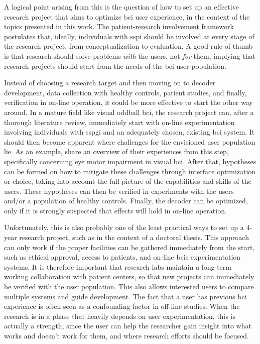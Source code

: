 A logical point arising from this is the question of how to set up an
effective research project that aims to optimize \ac{bci} user experience, in
the context of the topics presented in this work.
The patient-research involvement framework postulates that, ideally, individuals with
\ac{sspi} should be involved at every stage of the research project, from conceptualization
to evaluation.
A good rule of thumb is that research should solve problems \emph{with} the
users, not \emph{for} them, implying that research projects should start from
the needs of the \ac{bci} user population.

Instead of choosing a research target and then moving on to decoder
development, data collection with healthy controls, patient studies, and
finally, verification in on-line operation, it could be more effective to start
the other way around.
In a mature field like visual oddball \ac{bci}, the research project can, after
a thorough literature review, immediately start with on-line experimentation
involving individuals with \ac{sspgi} and an adequately chosen, existing \ac{bci} system.
It should then become apparent where challenges for the envisioned user
population lie.
As an example, \textcite{FriedOken2020} share an overview of their experiences from this step,
specifically concerning eye motor impairment in visual \ac{bci}.
After that, hypotheses can be formed on how to mitigate these challenges
through interface optimization or choice, taking into account the full picture
of the capabilities and skills of the users.
These hypotheses can then be verified in experiments
with the users and/or a population of healthy controls.
Finally, the decoder can be optimized, only if it is strongly suspected that
effects will hold in on-line operation.

Unfortunately, this is also probably one of the least practical ways to set up
a 4-year research project, such as in the context of a doctoral thesis.
This approach can only work if the proper facilities can be gathered immediately
from the start, such as ethical approval, access to patients, and on-line \acp{bci}
experimentation systems.
It is therefore important that research labs maintain a long-term working
collaboration with patient centers, so that new projects can immediately be
verified with the user population. This also allows interested users to compare
multiple systems and guide development.
The fact that a user has previous \ac{bci} experience is often seen as a confounding
factor in off-line studies.
When the research is in a phase that heavily depends on user
experimentation, this is actually a strength, since the user can help the researcher gain
insight into what works and doesn’t work for them, and where research efforts
should be focused.

